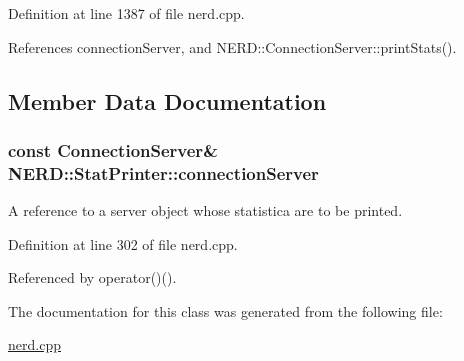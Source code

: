 \-Definition at line 1387 of file nerd.\-cpp.



\-References connection\-Server, and \-N\-E\-R\-D\-::\-Connection\-Server\-::print\-Stats().



\subsection{\-Member \-Data \-Documentation}
\hypertarget{classNERD_1_1StatPrinter_a6040df27f017b5ce2ac0ed1d9f68d50b}{
\subsubsection[{connection\-Server}]{\setlength{\rightskip}{0pt plus 5cm}const {\bf \-Connection\-Server}\& {\bf \-N\-E\-R\-D\-::\-Stat\-Printer\-::connection\-Server}}}
\label{classNERD_1_1StatPrinter_a6040df27f017b5ce2ac0ed1d9f68d50b}


\-A reference to a server object whose statistica are to be printed. 



\-Definition at line 302 of file nerd.\-cpp.



\-Referenced by operator()().



\-The documentation for this class was generated from the following file\-:\begin{DoxyCompactItemize}
\item 
\hyperlink{nerd_8cpp}{nerd.\-cpp}\end{DoxyCompactItemize}
